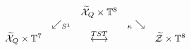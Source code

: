 \begin{equation*}
\begin{array}{ccccc}
&  & \widetilde{\mathcal{X}}_{Q}\times \mathbb{T}^{8} &  &  \\ 
& \swarrow _{S^{1}} &  & _{\kappa }\searrow &  \\ 
\widetilde{\mathcal{X}}_{Q}\times \mathbb{T}^{7} &  & \overset{TST}{%
\longleftrightarrow } &  & \widetilde{\mathcal{Z}}\times \mathbb{T}^{8}
\end{array}
\end{equation*}

